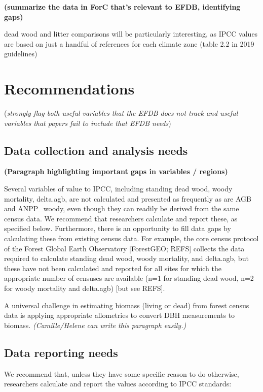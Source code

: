 \documentclass[, manuscript]{copernicus}
\begin{document}
\textbf{(summarize the data in ForC that's relevant to EFDB, identifying
gaps)}

dead wood and litter comparisons will be particularly interesting, as
IPCC values are based on just a handful of references for each climate
zone (table 2.2 in 2019 guidelines)

\section{Recommendations}

(\emph{strongly flag both useful variables that the EFDB does not track
and useful variables that papers fail to include that EFDB needs})

\subsection{Data collection and analysis needs}

\textbf{(Paragraph highlighting important gaps in variables / regions)}

Several variables of value to IPCC, including standing dead wood, woody
mortality, delta.agb, are not calculated and presented as frequently as
are AGB and ANPP\_woody, even though they can readily be derived from
the same census data. We recommend that researchers calculate and report
these, as specified below. Furthermore, there is an opportunity to fill
data gaps by calculating these from existing census data. For example,
the core census protocol of the Forest Global Earth Observatory
{[}ForestGEO; REFS{]} collects the data required to calculate standing
dead wood, woody mortality, and delta.agb, but these have not been
calculated and reported for all sites for which the appropriate number
of censuses are available (n=1 for standing dead wood, n=2 for woody
mortality and delta.agb) {[}but see REFS{]}.

A universal challenge in estimating biomass (living or dead) from forest
census data is applying appropriate allometries to convert DBH
measurements to biomass. \emph{(Camille/Helene can write this paragraph
easily.)}

\subsection{Data reporting needs}

We recommend that, unless they have some specific reason to do
otherwise, researchers calculate and report the values according to IPCC
standards:
\end{document}
